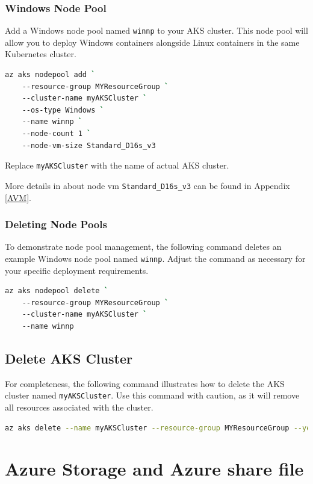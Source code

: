 \documentclass{article}
\begin{document}
\subsubsection{Windows Node Pool}

Add a Windows node pool named \texttt{winnp} to your AKS cluster. This node pool will allow you to deploy Windows containers alongside Linux containers in the same Kubernetes cluster.

\begin{lstlisting}[language=bash]
az aks nodepool add `
    --resource-group MYResourceGroup `
    --cluster-name myAKSCluster `
    --os-type Windows `
    --name winnp `
    --node-count 1 `
    --node-vm-size Standard_D16s_v3
\end{lstlisting}

Replace \texttt{myAKSCluster} with the name of actual AKS cluster.

More details in about node vm \texttt{Standard\_D16s\_v3} can be found in Appendix \ref{AVM}.

\subsubsection{Deleting Node Pools}

To demonstrate node pool management, the following command deletes an example Windows node pool named \texttt{winnp}. Adjust the command as necessary for your specific deployment requirements.

\begin{lstlisting}[language=bash]
az aks nodepool delete `
    --resource-group MYResourceGroup `
    --cluster-name myAKSCluster `
    --name winnp
\end{lstlisting}

\subsection{Delete AKS Cluster} 

For completeness, the following command illustrates how to delete the AKS cluster named \texttt{myAKSCluster}. Use this command with caution, as it will remove all resources associated with the cluster.

\begin{lstlisting}[language=bash]
az aks delete --name myAKSCluster --resource-group MYResourceGroup --yes --no-wait
\end{lstlisting}

\section{Azure Storage and Azure share file}  
\end{document}
